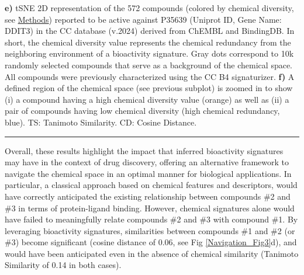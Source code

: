 \begin{Figure_modified}
{    \textbf{e)} tSNE 2D representation of the 572 compounds (colored by chemical diversity, see \hyperref[Navigation_Methods]{Methods}) reported to be active against P35639 (Uniprot ID, Gene Name: DDIT3) in the CC database (v.2024) derived from ChEMBL and BindingDB. In short, the chemical diversity value represents the chemical redundancy from the neighboring environment of a bioactivity signature. Gray dots correspond to 10k randomly selected compounds that serve as a background of the chemical space. All compounds were previously characterized using the CC B4 signaturizer\cite{bertoni_bioactivity_2021}.
    \textbf{f)} A defined region of the chemical space (see previous subplot) is zoomed in to show (i) a compound having a high chemical diversity value (orange) as well as (ii) a pair of compounds having low chemical diversity (high chemical redundancy, blue). TS: Tanimoto Similarity. CD: Cosine Distance. 
}
  \vspace{-5mm}
  \rule[0ex]{\textwidth}{0.5pt}
  \vspace{-9mm}
  \label{Navigation_Fig3}
\end{Figure_modified}


Overall, these results highlight the impact that inferred bioactivity signatures may have in the context of drug discovery, offering an alternative framework to navigate the chemical space in an optimal manner for biological applications. In particular, a classical approach based on chemical features and descriptors, would have correctly anticipated the existing relationship between compounds \#2 and \#3 in terms of protein-ligand binding. However, chemical signatures alone would have failed to meaningfully relate compounds \#2 and \#3 with compound \#1. By leveraging bioactivity signatures, similarities between compounds \#1 and \#2 (or \#3) become significant (cosine distance of 0.06, see Fig \ref{Navigation_Fig3}d), and would have been anticipated even in the absence of chemical similarity (Tanimoto Similarity of 0.14 in both cases). 
